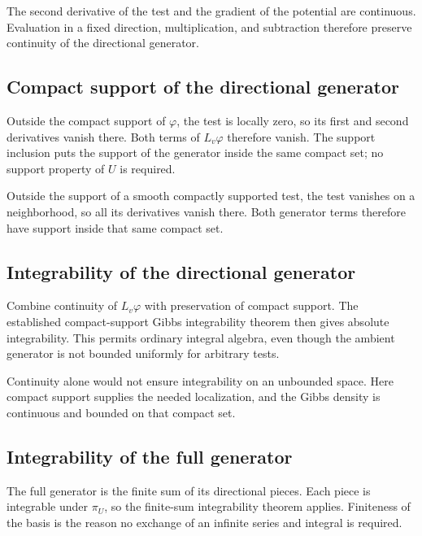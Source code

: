 \documentclass[11pt,a4paper]{article}
\begin{document}
The second derivative of the test and the gradient of the potential are continuous. Evaluation in a fixed direction, multiplication, and subtraction therefore preserve continuity of the directional generator.


\subsection{\texorpdfstring{Compact support of the directional generator}{Compact support of the directional generator}}


Outside the compact support of \(\varphi\), the test is locally zero, so its first and second derivatives vanish there. Both terms of \(L_v\varphi\) therefore vanish. The support inclusion puts the support of the generator inside the same compact set; no support property of \(U\) is required.



Outside the support of a smooth compactly supported test, the test vanishes on a neighborhood, so all its derivatives vanish there. Both generator terms therefore have support inside that same compact set.


\subsection{\texorpdfstring{Integrability of the directional generator}{Integrability of the directional generator}}


Combine continuity of \(L_v\varphi\) with preservation of compact support. The established compact-support Gibbs integrability theorem then gives absolute integrability. This permits ordinary integral algebra, even though the ambient generator is not bounded uniformly for arbitrary tests.



Continuity alone would not ensure integrability on an unbounded space. Here compact support supplies the needed localization, and the Gibbs density is continuous and bounded on that compact set.


\subsection{\texorpdfstring{Integrability of the full generator}{Integrability of the full generator}}


The full generator is the finite sum of its directional pieces. Each piece is integrable under \(\pi_U\), so the finite-sum integrability theorem applies. Finiteness of the basis is the reason no exchange of an infinite series and integral is required.
\end{document}
